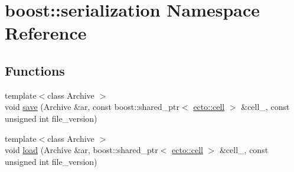 \hypertarget{namespaceboost_1_1serialization}{\section{boost\-:\-:serialization \-Namespace \-Reference}
\label{namespaceboost_1_1serialization}
}
\subsection*{\-Functions}
\begin{DoxyCompactItemize}
\item 
{\footnotesize template$<$class Archive $>$ }\\void \hyperlink{namespaceboost_1_1serialization_a2426e0778002bc8706de04819006b274}{save} (\-Archive \&ar, const boost\-::shared\-\_\-ptr$<$ \hyperlink{structecto_1_1cell}{ecto\-::cell} $>$ \&cell\-\_\-, const unsigned int file\-\_\-version)
\item 
{\footnotesize template$<$class Archive $>$ }\\void \hyperlink{namespaceboost_1_1serialization_a05438bec420c8465b28eab17e1e1dc16}{load} (\-Archive \&ar, boost\-::shared\-\_\-ptr$<$ \hyperlink{structecto_1_1cell}{ecto\-::cell} $>$ \&cell\-\_\-, const unsigned int file\-\_\-version)
\end{DoxyCompactItemize}


